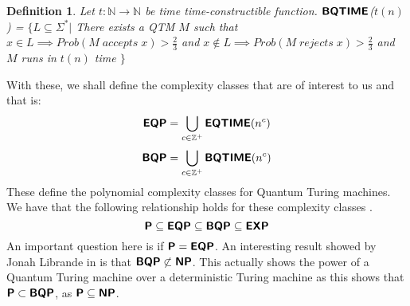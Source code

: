 \documentclass[11pt,a4paper]{article}
\newtheorem{definition}{Definition}
\newcommand{\classX}[1]{\ensuremath{\text{\textsf{\textbf{#1}}}}}
\newcommand{\classP}{\classX{P}}
\newcommand{\classNP}{\classX{NP}}
\newcommand{\EXP}{\classX{EXP}}
\newcommand{\EQ}{\classX{EQTIME}}
\newcommand{\EQP}{\classX{EQP}}
\newcommand{\BQ}{\classX{BQTIME}}
\newcommand{\BQP}{\classX{BQP}}
\begin{document}
    \begin{definition}
        Let $t: \mathbb{N} \to \mathbb{N}$ be time time-constructible function. \BQ($t(n)$) = $\{L \subseteq \Sigma^*|$ There exists a QTM $M$ such that $x\in L \implies Prob(M \; accepts \;x) > \frac{2}{3}$  and $x\not\in L \implies Prob(M \; rejects \;x) > \frac{2}{3}$ and $M$ runs in $t(n)$ time $\}$
    \end{definition}
    With these, we shall define the complexity classes that are of interest to us and that is:
    $$\EQP = \bigcup_{c \in \mathbb{Z}^+} \EQ(n^c)$$
    $$\BQP=  \bigcup_{c \in \mathbb{Z}^+} \BQ(n^c)$$
    These define the polynomial complexity classes for Quantum Turing machines.
    We have that the following relationship holds for these complexity classes \cite{6}\cite{8}.
    $$\classP \subseteq \EQP \subseteq \BQP \subseteq \EXP$$
    An important question here is if $\classP = \EQP$. An interesting result showed by Jonah Librande in \cite{13} is that $\BQP \not\subset \classNP$. 
    This actually shows the power of a Quantum Turing machine over a deterministic Turing machine as this shows that $\classP \subset \BQP$, as $\classP \subseteq \classNP$.
\end{document}
